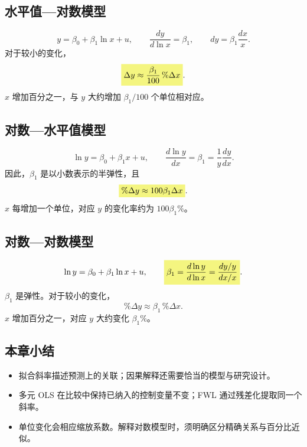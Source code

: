 \subsection{水平值—对数模型}
\[y=\beta_0+\beta_1\ln x+u,\qquad
\frac{dy}{d\ln x}=\beta_1,\qquad
dy=\beta_1\frac{dx}{x}.\]
对于较小的变化，
\[\hm{\Delta y\approx\frac{\beta_1}{100}\,\%\Delta x}.\]
$x$ 增加百分之一，与 $y$ 大约增加 $\beta_1/100$ 个单位相对应。

\subsection{对数—水平值模型}
\[\ln y=\beta_0+\beta_1x+u,\qquad
\frac{d\ln y}{dx}=\beta_1=\frac{1}{y}\frac{dy}{dx}.\]
因此，$\beta_1$ 是以小数表示的半弹性，且
\[\hm{\%\Delta y\approx100\beta_1\Delta x}.\]
$x$ 每增加一个单位，对应 $y$ 的变化率约为 $100\beta_1\%$。

\subsection{对数—对数模型}
\[\ln y=\beta_0+\beta_1\ln x+u,\qquad
\hm{\beta_1=\frac{d\ln y}{d\ln x}
=\frac{dy/y}{dx/x}}.\]
$\beta_1$ 是弹性。对于较小的变化，
\[\%\Delta y\approx\beta_1\,\%\Delta x.\]
$x$ 增加百分之一，对应 $y$ 大约变化 $\beta_1\%$。

\subsection*{本章小结}
\begin{itemize}
\item 拟合斜率描述预测上的关联；因果解释还需要恰当的模型与研究设计。
\item 多元 OLS 在比较中保持已纳入的控制变量不变；FWL 通过残差化提取同一个斜率。
\item 单位变化会相应缩放系数。解释对数模型时，须明确区分精确关系与百分比近似。
\end{itemize}
